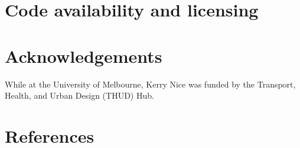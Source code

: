 \documentclass[final,3p,times,authoryear]{elsarticle}
\begin{document}
\section{Code availability and licensing}\label{sec:available}





\section*{Acknowledgements}
While at the University of Melbourne, Kerry Nice was funded by the Transport, Health, and Urban Design (THUD) Hub. 
 

\section*{References}\label{sec:ref}
   
  


\begin{thebibliography}{00}


\bibitem[ ()]{}

\end{thebibliography}



\end{document}
